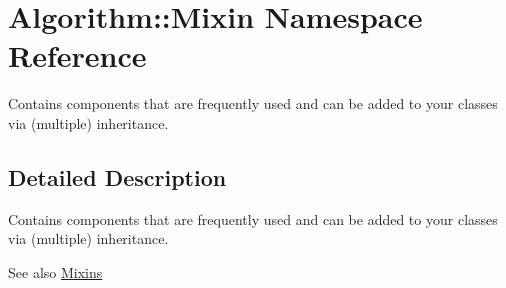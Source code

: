 \hypertarget{namespaceAlgorithm_1_1Mixin}{}\section{Algorithm\+:\+:Mixin Namespace Reference}
\label{namespaceAlgorithm_1_1Mixin}


Contains components that are frequently used and can be added to your classes via (multiple) inheritance.  




\subsection{Detailed Description}
Contains components that are frequently used and can be added to your classes via (multiple) inheritance. 

\begin{DoxySeeAlso}{See also}
\hyperlink{group__MixinGroup}{Mixins} 
\end{DoxySeeAlso}
